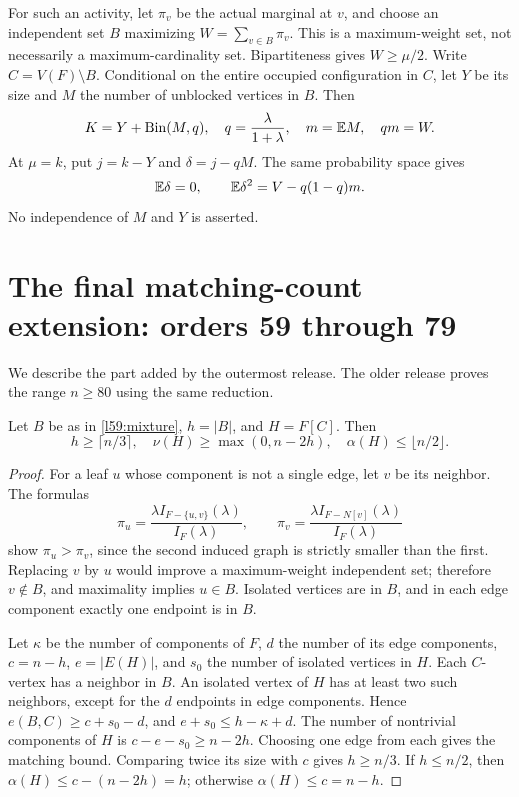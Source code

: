 For such an activity, let $\pi_v$ be the actual marginal at $v$, and choose an independent set $B$ maximizing $W=\sum_{v\in B}\pi_v$. This is a maximum-weight set, not necessarily a maximum-cardinality set. Bipartiteness gives $W\ge\mu/2$. Write $C=V(F)\setminus B$. Conditional on the entire occupied configuration in $C$, let $Y$ be its size and $M$ the number of unblocked vertices in $B$. Then
\begin{equation}\label{l59:mixture}
 K=Y+\operatorname{Bin}(M,q),\quad q=\frac\lambda{1+\lambda},\quad m=\mathbb E M,\quad qm=W.
\end{equation}
At $\mu=k$, put $j=k-Y$ and $\delta=j-qM$. The same probability space gives
\begin{equation}\label{l59:moments}
 \mathbb E\delta=0,\qquad \mathbb E\delta^2=V-q(1-q)m.
\end{equation}
No independence of $M$ and $Y$ is asserted.

\section{The final matching-count extension: orders 59 through 79}\label{sec:matching59}
We describe the part added by the outermost release. The older release proves the range $n\ge80$ using the same reduction.

\begin{lemma}\label{l59:matching}
Let $B$ be as in \eqref{l59:mixture}, $h=|B|$, and $H=F[C]$. Then
\[
 h\ge\lceil n/3\rceil,\quad \nu(H)\ge\max(0,n-2h),\quad \alpha(H)\le\lfloor n/2\rfloor.
\]
\end{lemma}
\begin{proof}
For a leaf $u$ whose component is not a single edge, let $v$ be its neighbor. The formulas
\[
 \pi_u=\frac{\lambda I_{F-\{u,v\}}(\lambda)}{I_F(\lambda)},\qquad
 \pi_v=\frac{\lambda I_{F-N[v]}(\lambda)}{I_F(\lambda)}
\]
show $\pi_u>\pi_v$, since the second induced graph is strictly smaller than the first. Replacing $v$ by $u$ would improve a maximum-weight independent set; therefore $v\notin B$, and maximality implies $u\in B$. Isolated vertices are in $B$, and in each edge component exactly one endpoint is in $B$.

Let $\kappa$ be the number of components of $F$, $d$ the number of its edge components, $c=n-h$, $e=|E(H)|$, and $s_0$ the number of isolated vertices in $H$. Each $C$-vertex has a neighbor in $B$. An isolated vertex of $H$ has at least two such neighbors, except for the $d$ endpoints in edge components. Hence $e(B,C)\ge c+s_0-d$, and $e+s_0\le h-\kappa+d$. The number of nontrivial components of $H$ is $c-e-s_0\ge n-2h$. Choosing one edge from each gives the matching bound. Comparing twice its size with $c$ gives $h\ge n/3$. If $h\le n/2$, then $\alpha(H)\le c-(n-2h)=h$; otherwise $\alpha(H)\le c=n-h$.
\end{proof}

